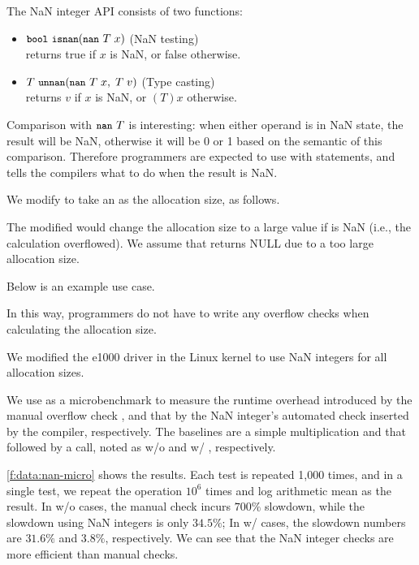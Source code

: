 \noindent
The NaN integer API consists of two functions:
\begin{itemize}
\item
$\cc{bool}\ \cc{isnan}(\cc{nan}\ T\; x)$ \hfill (NaN testing) \\
returns true if $x$ is NaN, or false otherwise.
\item
$T\ \cc{unnan}(\cc{nan}\ T\; x,\; T\; v)$ \hfill (Type casting) \\
returns $v$ if $x$ is NaN, or $(T)x$ otherwise.
\end{itemize}


\fi

Comparison with $\cc{nan}\ T$ is interesting: when either operand is 
in NaN state, the result will be NaN, otherwise it will be 0 or 1 based on
the semantic of this comparison. Therefore programmers are expected to 
use  with  statements, and tells the compilers what to do
when the result is NaN.

We modify  to take an  as
the allocation size, as follows.

The modified  would change the allocation size to a large
value  if  is NaN (i.e., the calculation
overflowed).  We assume that  returns
NULL due to a too large allocation size.

Below is an example use case.

In this way, programmers do not have to write any overflow checks
when calculating the allocation size.

We modified the e1000 driver in the Linux kernel to use NaN integers
for all allocation sizes.

We use  as a microbenchmark to measure the runtime
overhead introduced by the manual overflow check , and that by the NaN integer's automated check
inserted by the compiler, respectively.
%
The baselines are a simple multiplication and that followed by a
 call, noted as w/o and w/ , respectively.

\autoref{f:data:nan-micro} shows the results. Each test is repeated 1,000 times,
and in a single test, we repeat the operation $10^6$ times and log arithmetic mean
as the result.
%
In w/o  cases, the manual check incurs $700\%$ slowdown, while
the slowdown using NaN integers is only $34.5\%$;
%
In w/  cases, the slowdown numbers are $31.6\%$ and $3.8\%$,
respectively.
%
We can see that the NaN integer checks are more efficient than
manual checks.

